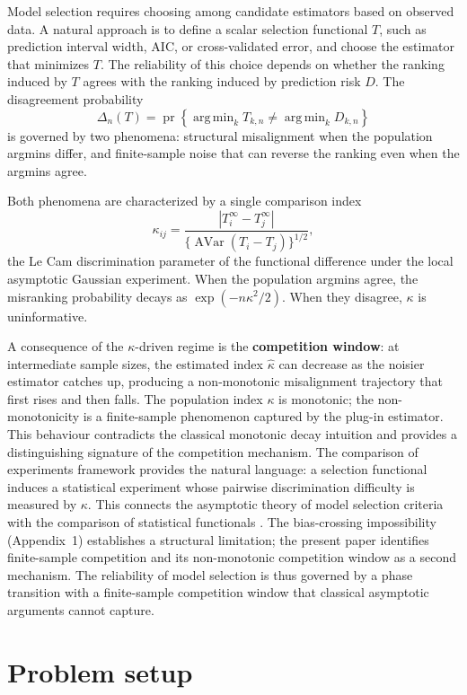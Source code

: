 \documentclass[lineno]{biometrika}
\DeclareMathOperator{\AVar}{AVar}
\DeclareMathOperator{\argmin}{arg\,min}
\DeclareMathOperator{\pr}{pr}
\begin{document}
Model selection requires choosing among candidate estimators based on observed data. A natural approach is to define a scalar selection functional $T$, such as prediction interval width, AIC, or cross-validated error, and choose the estimator that minimizes $T$. The reliability of this choice depends on whether the ranking induced by $T$ agrees with the ranking induced by prediction risk $D$. The disagreement probability
\[
\Delta_n(T) = \pr\!\left\{\argmin_k T_{k,n} \neq \argmin_k D_{k,n}\right\}
\]
is governed by two phenomena: structural misalignment when the population argmins differ, and finite-sample noise that can reverse the ranking even when the argmins agree.

Both phenomena are characterized by a single comparison index
\[
\kappa_{ij} = \frac{|T_i^\infty - T_j^\infty|}{\{\AVar(T_i - T_j)\}^{1/2}},
\]
the Le Cam discrimination parameter of the functional difference under the local asymptotic Gaussian experiment. When the population argmins agree, the misranking probability decays as $\exp(-n\kappa^2/2)$. When they disagree, $\kappa$ is uninformative.

A consequence of the $\kappa$-driven regime is the \textbf{competition window}: at intermediate sample sizes, the estimated index $\hat\kappa$ can decrease as the noisier estimator catches up, producing a non-monotonic misalignment trajectory that first rises and then falls. The population index $\kappa$ is monotonic; the non-monotonicity is a finite-sample phenomenon captured by the plug-in estimator. This behaviour contradicts the classical monotonic decay intuition and provides a distinguishing signature of the competition mechanism. The comparison of experiments framework \citep{LeCam:1986} provides the natural language: a selection functional induces a statistical experiment whose pairwise discrimination difficulty is measured by $\kappa$. This connects the asymptotic theory of model selection criteria \citep{Hastie:2009,Yang:2024} with the comparison of statistical functionals \citep{LeCam:1986,Bickel:2015}. The bias-crossing impossibility (Appendix~1) establishes a structural limitation; the present paper identifies finite-sample competition and its non-monotonic competition window as a second mechanism. The reliability of model selection is thus governed by a phase transition with a finite-sample competition window that classical asymptotic arguments cannot capture.

\section{Problem setup}
\end{document}
